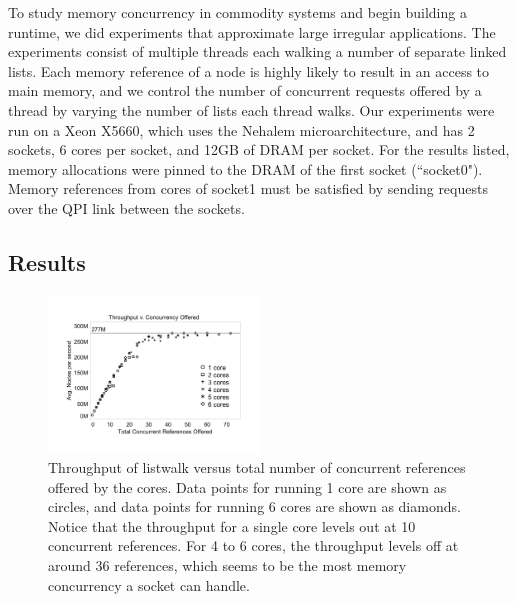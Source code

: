 

To study memory concurrency in commodity systems and begin building a runtime, we did experiments that approximate large irregular applications. The experiments consist of multiple threads each walking a number of separate linked lists. Each memory reference of a node is highly likely to result in an access to main memory, and we control the number of concurrent requests offered by a thread by varying the number of lists each thread walks.  Our experiments were run on a Xeon X5660, which uses the Nehalem microarchitecture, and has 2 sockets, 6 cores per socket, and 12GB of DRAM per socket. For the results listed, memory allocations were pinned to the DRAM of the first socket (``socket0"). Memory references from cores of socket1 must be satisfied by sending requests over the QPI link between the sockets. 
\subsection{Results}
 

\begin{figure}[h]
	\begin{center}
		\includegraphics[width=0.5\textwidth]{figures/multi-listwalk-totalconc-edited.pdf}
	\end{center}
	\caption{Throughput of listwalk versus total number of concurrent references offered by the cores. Data points for running 1 core are shown as circles, and data points for running 6 cores are shown as diamonds. Notice that the throughput for a single core levels out at 10 concurrent references. For 4 to 6 cores, the throughput levels off at around 36 references, which seems to be the most memory concurrency a socket can handle.}
	\label{fig:listwalk-totalconc}
\end{figure}

